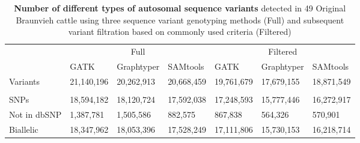 \documentclass[../main.tex]{subfiles}
\begin{document}
\begin{landscape}
\begin{table}
    \vspace{10mm} 
    \centering
    \caption{\textbf{Number of different types of autosomal sequence variants} detected in 49 Original Braunvieh cattle using three sequence variant genotyping methods (Full) and subsequent variant filtration based on commonly used criteria (Filtered)}
    \vspace{10mm}
    \begin{tabular}{|l|l|l|l|l|l|l|} 
    \cline{2-7}
    \multicolumn{1}{l|}{} & \multicolumn{3}{c|}{\multirow{2}{*}{Full}}                                      & \multicolumn{3}{c|}{\multirow{2}{*}{Filtered}}                                   \\
    \multicolumn{1}{l|}{} & \multicolumn{3}{l|}{}                                                           & \multicolumn{3}{l|}{}                                                            \\ 
    \cline{2-7}
    \multicolumn{1}{l|}{} & \multirow{2}{*}{GATK} & \multirow{2}{*}{Graphtyper} & \multirow{2}{*}{SAMtools} & \multirow{2}{*}{GATK} & \multirow{2}{*}{Graphtyper} & \multirow{2}{*}{SAMtools}  \\ 
    \cline{1-1}
                          &                       &                             &                           &                       &                             &                            \\ 
    \hline
    Variants              & 21,140,196            & 20,262,913                  & 20,668,459                & 19,761,679            & 17,679,155                  & 18,871,549                 \\ 
    \hline
    \multicolumn{7}{|l|}{}                                                                                                                                                                     \\ 
    \hline
    SNPs                  & 18,594,182            & 18,120,724                  & 17,592,038                & 17,248,593            & 15,777,446                  & 16,272,917                 \\ 
    \hline
    Not in dbSNP          & 1,387,781             & 1,505,586                   & 882,575                   & 867,838               & 564,326                     & 570,901                    \\ 
    \hline
    Biallelic             & 18,347,962            & 18,053,396                  & 17,528,249                & 17,111,806            & 15,730,153                  & 16,218,714                 \\ 

\end{tabular}
\end{table}
\end{landscape}
\end{document}

